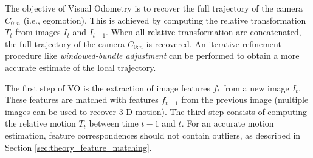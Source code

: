 The objective of Visual Odometry is to recover the full trajectory of the camera $C_{0:n}$ (i.e., egomotion).
This is achieved by computing the relative transformation $T_t$ from images $I_t$ and $I_{t-1}$.
When all relative transformation are concatenated, the full trajectory of the camera $C_{0:n}$ is recovered.
An iterative refinement procedure like \textit{windowed-bundle adjustment} can be performed to obtain a more accurate estimate of the local trajectory.

The first step of VO is the extraction of image features $f_t$ from a new image $I_t$.
These features are matched with features $f_{t-1}$ from the previous image (multiple images can be used to recover 3-D motion).
The third step consists of computing the relative motion $T_t$ between time $t-1$ and $t$.
For an accurate motion estimation, feature correspondences should not contain outliers, as described in Section \ref{sec:theory_feature_matching}.

